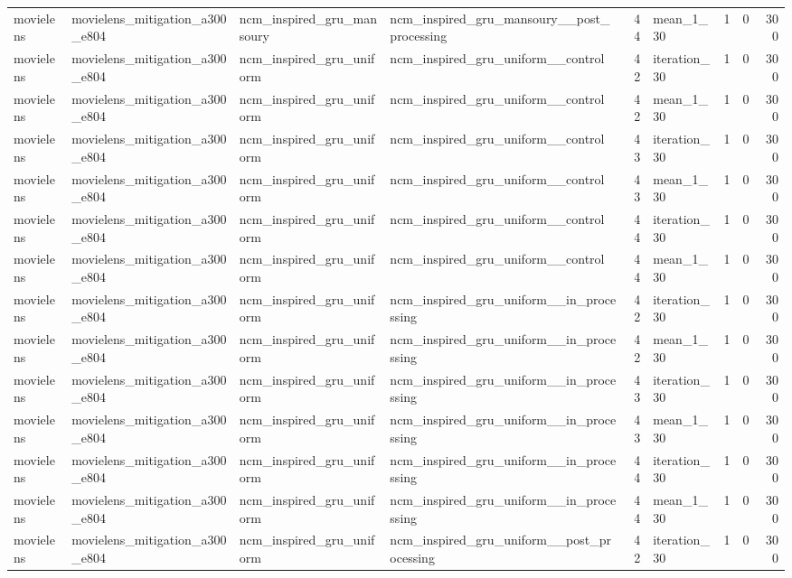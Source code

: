 \begin{table}[htbp!]
\begin{tabular}{llllrlrrr}
movielens & movielens\_mitigation\_a300\_e804 & ncm\_inspired\_gru\_mansoury & ncm\_inspired\_gru\_mansoury\_\_post\_processing & 44 & mean\_1\_30 & 1 & 0 & 300 \\
movielens & movielens\_mitigation\_a300\_e804 & ncm\_inspired\_gru\_uniform & ncm\_inspired\_gru\_uniform\_\_control & 42 & iteration\_30 & 1 & 0 & 300 \\
movielens & movielens\_mitigation\_a300\_e804 & ncm\_inspired\_gru\_uniform & ncm\_inspired\_gru\_uniform\_\_control & 42 & mean\_1\_30 & 1 & 0 & 300 \\
movielens & movielens\_mitigation\_a300\_e804 & ncm\_inspired\_gru\_uniform & ncm\_inspired\_gru\_uniform\_\_control & 43 & iteration\_30 & 1 & 0 & 300 \\
movielens & movielens\_mitigation\_a300\_e804 & ncm\_inspired\_gru\_uniform & ncm\_inspired\_gru\_uniform\_\_control & 43 & mean\_1\_30 & 1 & 0 & 300 \\
movielens & movielens\_mitigation\_a300\_e804 & ncm\_inspired\_gru\_uniform & ncm\_inspired\_gru\_uniform\_\_control & 44 & iteration\_30 & 1 & 0 & 300 \\
movielens & movielens\_mitigation\_a300\_e804 & ncm\_inspired\_gru\_uniform & ncm\_inspired\_gru\_uniform\_\_control & 44 & mean\_1\_30 & 1 & 0 & 300 \\
movielens & movielens\_mitigation\_a300\_e804 & ncm\_inspired\_gru\_uniform & ncm\_inspired\_gru\_uniform\_\_in\_processing & 42 & iteration\_30 & 1 & 0 & 300 \\
movielens & movielens\_mitigation\_a300\_e804 & ncm\_inspired\_gru\_uniform & ncm\_inspired\_gru\_uniform\_\_in\_processing & 42 & mean\_1\_30 & 1 & 0 & 300 \\
movielens & movielens\_mitigation\_a300\_e804 & ncm\_inspired\_gru\_uniform & ncm\_inspired\_gru\_uniform\_\_in\_processing & 43 & iteration\_30 & 1 & 0 & 300 \\
movielens & movielens\_mitigation\_a300\_e804 & ncm\_inspired\_gru\_uniform & ncm\_inspired\_gru\_uniform\_\_in\_processing & 43 & mean\_1\_30 & 1 & 0 & 300 \\
movielens & movielens\_mitigation\_a300\_e804 & ncm\_inspired\_gru\_uniform & ncm\_inspired\_gru\_uniform\_\_in\_processing & 44 & iteration\_30 & 1 & 0 & 300 \\
movielens & movielens\_mitigation\_a300\_e804 & ncm\_inspired\_gru\_uniform & ncm\_inspired\_gru\_uniform\_\_in\_processing & 44 & mean\_1\_30 & 1 & 0 & 300 \\
movielens & movielens\_mitigation\_a300\_e804 & ncm\_inspired\_gru\_uniform & ncm\_inspired\_gru\_uniform\_\_post\_processing & 42 & iteration\_30 & 1 & 0 & 300 \\

\end{tabular}
\end{table}
